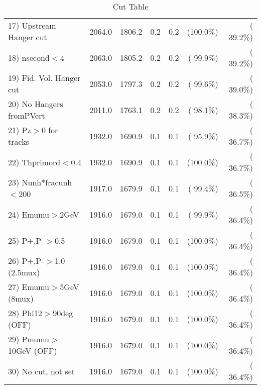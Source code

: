 \begin{table}[h!]
\begin{tabular}{||l||r|r|r|r|r|r||}
 17) Upstream Hanger cut  &       2064.0 &       1806.2 &          0.2 &          0.2 & (100.0\%) & ( 39.2\%) \\
 18) nsecond$<$4          &       2063.0 &       1805.2 &          0.2 &          0.2 & ( 99.9\%) & ( 39.2\%) \\
 19) Fid. Vol. Hanger cut &       2053.0 &       1797.3 &          0.2 &          0.2 & ( 99.6\%) & ( 39.0\%) \\
 20) No Hangers fromPVert &       2011.0 &       1763.1 &          0.2 &          0.2 & ( 98.1\%) & ( 38.3\%) \\
 21) Pz$>$0 for tracks    &       1932.0 &       1690.9 &          0.1 &          0.1 & ( 95.9\%) & ( 36.7\%) \\
 22) Thprimord$<$0.4      &       1932.0 &       1690.9 &          0.1 &          0.1 & (100.0\%) & ( 36.7\%) \\
 23) Nunh*fracunh$<$200   &       1917.0 &       1679.9 &          0.1 &          0.1 & ( 99.4\%) & ( 36.5\%) \\
 24) Emumu$>$2GeV         &       1916.0 &       1679.0 &          0.1 &          0.1 & ( 99.9\%) & ( 36.4\%) \\
 25) P+,P-$>$0.5          &       1916.0 &       1679.0 &          0.1 &          0.1 & (100.0\%) & ( 36.4\%) \\
 26) P+,P-$>$1.0 (2.5mux) &       1916.0 &       1679.0 &          0.1 &          0.1 & (100.0\%) & ( 36.4\%) \\
 27) Emumu$>$5GeV  (8mux) &       1916.0 &       1679.0 &          0.1 &          0.1 & (100.0\%) & ( 36.4\%) \\
 28) Phi12$>$90deg  (OFF) &       1916.0 &       1679.0 &          0.1 &          0.1 & (100.0\%) & ( 36.4\%) \\
 29) Pmumu$>$10GeV  (OFF) &       1916.0 &       1679.0 &          0.1 &          0.1 & (100.0\%) & ( 36.4\%) \\
 30) No cut, not set      &       1916.0 &       1679.0 &          0.1 &          0.1 & (100.0\%) & ( 36.4\%) \\
 \hline
 \hline
 \end{tabular}
 \caption{Cut Table           }
 \label{tab-cutcohjpsi-mumu_jpsi}
 \end{table}
